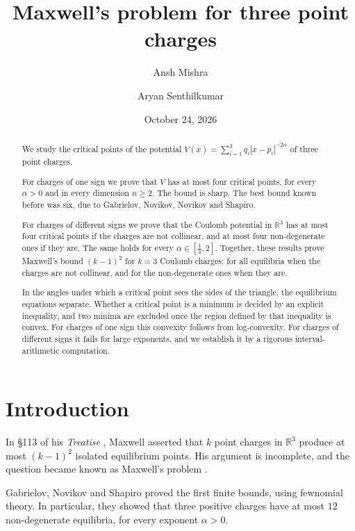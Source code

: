\documentclass[11pt]{amsart}
\title{Maxwell's problem for three point charges}
\author{Ansh Mishra}
\author{Aryan Senthilkumar}
\date{October 24, 2026}
\theoremstyle{remark}
\newcommand{\R}{\mathbb{R}}
\begin{document}
\begin{abstract}
We study the critical points of the potential $V(x)=\sum_{i=1}^{3}q_i|x-p_i|^{-2\alpha}$ of three point charges.

For charges of one sign we prove that $V$ has at most four critical points, for every $\alpha>0$ and in every dimension
$n\ge2$. The bound is sharp. The best bound known before was six, due to Gabrielov, Novikov, Novikov and Shapiro.

For charges of different signs we prove that the Coulomb potential in $\R^3$ has at most four critical points if the
charges are not collinear, and at most four non-degenerate ones if they are. The same holds for every
$\alpha\in[\tfrac14,2]$. Together, these results prove Maxwell's bound $(k-1)^2$ for $k=3$ Coulomb charges: for all
equilibria when the charges are not collinear, and for the non-degenerate ones when they are.

In the angles under which a critical point sees the sides of the triangle, the equilibrium equations separate.
Whether a critical point is a minimum is decided by an explicit inequality, and two minima are excluded once the region
defined by that inequality is convex. For charges of one sign this convexity follows from log-convexity. For charges of
different signs it fails for large exponents, and we establish it by a rigorous interval-arithmetic computation.
\end{abstract}

\maketitle

\section{Introduction}

In \S113 of his \emph{Treatise} \cite{Max}, Maxwell asserted that $k$ point charges in $\R^3$ produce at most $(k-1)^2$
isolated equilibrium points. His argument is incomplete, and the question became known as Maxwell's problem
\cite{GNS}.

Gabrielov, Novikov and Shapiro \cite{GNS} proved the first finite bounds, using fewnomial theory. In particular, they
showed that three positive charges have at most $12$ non-degenerate equilibria, for every exponent $\alpha>0$.
\end{document}
